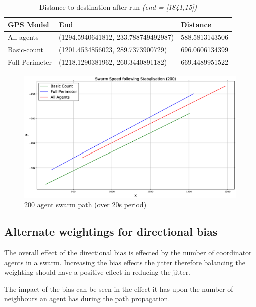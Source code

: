 \begin{table}[H]
\begin{center}
\begin{tabular}{| l | l | l |}
\hline
GPS Model & End & Distance \\ \hline
All-agents & (1294.5940641812, 233.788749492987) & 588.5813143506\\ \hline
Basic-count & (1201.4534856023, 289.7373900729) & 696.0606134399\\ \hline
Full Perimeter & (1218.1290381962, 260.3440891182) & 669.4489951522\\ \hline
\end{tabular}\caption[Distance to destination after run]{Distance to destination after run \textit{(end = [1841,15])}}\label{tab:SwarmDistanceEnd}
\end{center}
\end{table}

\begin{figure}[H]
\begin{center}
\includegraphics[width=14cm]{CHAPTER-6/figures/SwarmSpeed1}
\end{center}
\caption{200 agent swarm path (over 20s period)\label{fig:SwarmSpeed1}}
\end{figure}

\subsection{Alternate weightings for directional bias}\label{sec:AlternateBias1}
The overall effect of the directional bias is effected by the number of coordinator agents in a swarm. Increasing the bias effects the jitter therefore balancing the weighting should have a positive effect in reducing the jitter.

The impact of the bias can be seen in the effect it has upon the number of neighbours an agent has during the path propagation.

